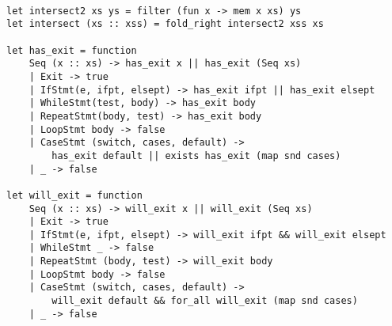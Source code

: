 \begin{lstlisting}[language=Ml]

let intersect2 xs ys = filter (fun x -> mem x xs) ys
let intersect (xs :: xss) = fold_right intersect2 xss xs 

let has_exit = function
    Seq (x :: xs) -> has_exit x || has_exit (Seq xs)
    | Exit -> true
    | IfStmt(e, ifpt, elsept) -> has_exit ifpt || has_exit elsept
    | WhileStmt(test, body) -> has_exit body
    | RepeatStmt(body, test) -> has_exit body
    | LoopStmt body -> false
    | CaseStmt (switch, cases, default) ->
        has_exit default || exists has_exit (map snd cases)
    | _ -> false

let will_exit = function
    Seq (x :: xs) -> will_exit x || will_exit (Seq xs)
    | Exit -> true
    | IfStmt(e, ifpt, elsept) -> will_exit ifpt && will_exit elsept
    | WhileStmt _ -> false
    | RepeatStmt (body, test) -> will_exit body
    | LoopStmt body -> false
    | CaseStmt (switch, cases, default) ->
        will_exit default && for_all will_exit (map snd cases)
    | _ -> false


\end{lstlisting}
